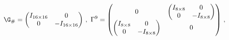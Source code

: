 \begin{equation}%
\G_\# = 
\begin{pmatrix} 
 I_{16\times16} &  0 \cr 
  0 &  -I_{16\times16} 
\end{pmatrix} 
  \,, 
~ 
\Gamma^9 = 
\begin{pmatrix} 
0  & 
\begin{pmatrix} I_{\small 8 \times 8} & 0 \\
0 & -I_{\small 8 \times 8}
\end{pmatrix} \cr 
\begin{pmatrix} I_{\small 8 \times 8} & 0 \\
0 & -I_{\small 8 \times 8}
\end{pmatrix}
& 0 
\end{pmatrix} 
  \,, 
\end{equation} 
